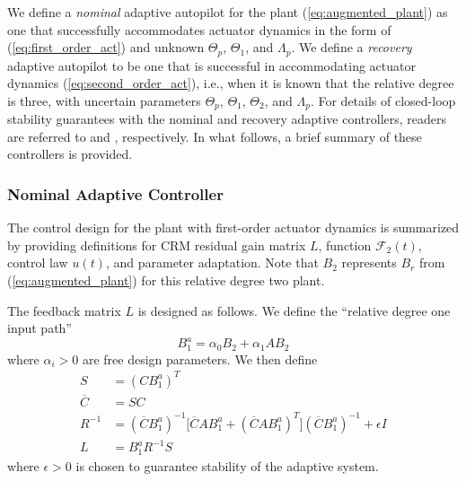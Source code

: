 \documentclass[english]{ifacconf}
\begin{document}
We define a \textit{nominal} adaptive autopilot for the plant (\ref{eq:augmented_plant}) as one that successfully accommodates actuator dynamics in the form of (\ref{eq:first_order_act}) and unknown $\Theta_p$, $\Theta_1$, and $\Lambda_p$. We define a \textit{recovery} adaptive autopilot to be one that is successful in accommodating actuator dynamics (\ref{eq:second_order_act}), i.e., when it is known that the relative degree is three, with uncertain parameters $\Theta_p$, $\Theta_1$, $\Theta_2$, and $\Lambda_p$. For details of closed-loop stability guarantees with the nominal and recovery adaptive controllers, readers are referred to \cite{qu2016adaptive} and \cite{qu2016phd}, respectively. In what follows, a brief summary of these controllers is provided.
 
\subsubsection{Nominal Adaptive Controller}
The control design for the plant with first-order actuator dynamics is summarized by providing definitions for CRM residual gain matrix $L$, function $\mathcal{F}_2(t)$, control law $u(t)$, and parameter adaptation. Note that $B_2$ represents $B_r$ from (\ref{eq:augmented_plant}) for this relative degree two plant. 

The feedback matrix $L$ is designed as follows. We define the ``relative degree one input path''
\begin{equation}
B_1^a = \alpha_0 B_2 + \alpha_1 A B_2 \label{eq:rd2-b1a}
\end{equation}
where $\alpha_i > 0$ are free design parameters. We then define
\begin{align}
S &= (C B_1^a)^T \label{eq:S}\\	\overline{C} & = S C\\ R^{-1} &= (\overline{C} B_1^a)^{-1} \big[ \overline{C} A B_1^a + (\overline{C} A B_1^a)^T\big] (\overline{C} B_1^a)^{-1} + \epsilon I \\ L & = B_1^a R^{-1} S \label{eq:L}
\end{align}
where $\epsilon > 0$ \cite[Eq. 30]{qu2015adaptive} is chosen to guarantee stability of the adaptive system. 
\end{document}
